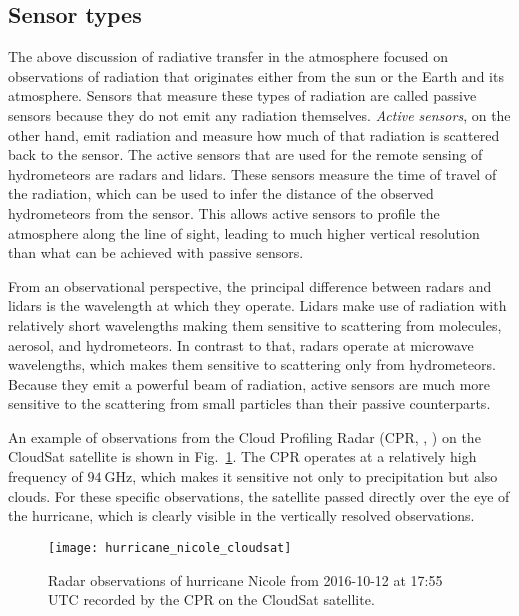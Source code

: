 \subsection{Sensor types}

The above discussion of radiative transfer in the atmosphere focused on
observations of radiation that originates either from the sun or the Earth and
its atmosphere. Sensors that measure these types of radiation are called passive
sensors because they do not emit any radiation themselves. \textit{Active
sensors}, on the other hand, emit radiation and measure how much of that
radiation is scattered back to the sensor. The active sensors that are used for
the remote sensing of hydrometeors are radars and lidars. These sensors measure
the time of travel of the radiation, which can be used to infer the distance of
the observed hydrometeors from the sensor. This allows active sensors to profile
the atmosphere along the line of sight, leading to much higher vertical
resolution than what can be achieved with passive sensors.

From an observational perspective, the principal difference between radars and
lidars is the wavelength at which they operate. Lidars make use of radiation
with relatively short wavelengths making them sensitive to scattering from
molecules, aerosol, and hydrometeors. In contrast to that, radars operate at
microwave wavelengths, which makes them sensitive to scattering only from
hydrometeors. Because they emit a powerful beam of radiation, active sensors are
much more sensitive to the scattering from small particles than their passive
counterparts.

An example of observations from the Cloud Profiling Radar
(CPR, \citeauthor{tanelli08}, \citeyear{tanelli08}) on the CloudSat satellite is
shown in Fig.~\ref{fig:radiative_transfer:cloud_sat}. The CPR operates at a
relatively high frequency of $\SI{94}{\giga \hertz}$, which makes it sensitive
not only to precipitation but also clouds. For these specific observations, the
satellite passed directly over the eye of the hurricane, which is clearly
visible in the vertically resolved observations.

\begin{figure}
\centering
\texttt{[image: hurricane\_nicole\_cloudsat]}
\caption{
Radar observations of hurricane Nicole from 2016-10-12 at
17:55 UTC recorded by the CPR on the CloudSat satellite.
}
\label{fig:radiative_transfer:cloud_sat}
\end{figure}

